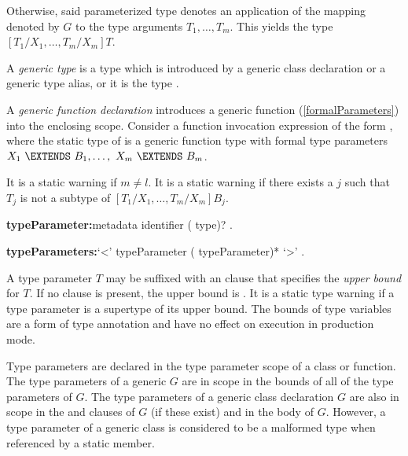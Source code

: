 \documentclass{article}
\begin{document}

\LMHash{}
Otherwise, said parameterized type
denotes an application of the mapping denoted by $G$ to the type arguments
$T_1, \ldots, T_m$.
This yields the type
$[T_1/X_1, \ldots, T_m/X_m]T$.


\LMHash{}
A {\em generic type} is a type which is introduced by
a generic class declaration or a generic type alias,
or it is the type .

\LMHash{}
A {\em generic function declaration} introduces a generic function (\ref{formalParameters}) into the enclosing scope.
Consider a function invocation expression of the form
,
where the static type of  is a generic function type with formal type parameters
$X_1\ \EXTENDS\ B_1, \ldots,\ X_m\ \EXTENDS\ B_m$.

\LMHash{}
It is a static warning if $m \not= l$.
It is a static warning if there exists a $j$
such that $T_j$ is not a subtype of $[T_1/X_1, \ldots, T_m/X_m]B_j$.


\begin{grammar}
{\bf typeParameter:}metadata identifier (\EXTENDS{} type)?
  .

{\bf typeParameters:}`<' typeParameter (\gcomma{} typeParameter)* `>'
  .
\end{grammar}

\LMHash{}
A type parameter $T$ may be suffixed with an \EXTENDS{} clause that specifies the {\em upper bound} for $T$.
If no \EXTENDS{} clause is present, the upper bound is .
It is a static type warning if a type parameter is a supertype of its upper bound.
The bounds of type variables are a form of type annotation and have no effect on execution in production mode.

\LMHash{}
Type parameters are declared in the type parameter scope of a class or function.
The type parameters of a generic $G$ are in scope in the bounds of all of the type parameters of $G$.
The type parameters of a generic class declaration $G$ are also in scope in the \EXTENDS{} and \IMPLEMENTS{} clauses of $G$ (if these exist) and in the body of $G$.
However, a type parameter of a generic class is considered to be a malformed type when referenced by a static member.
\end{document}
